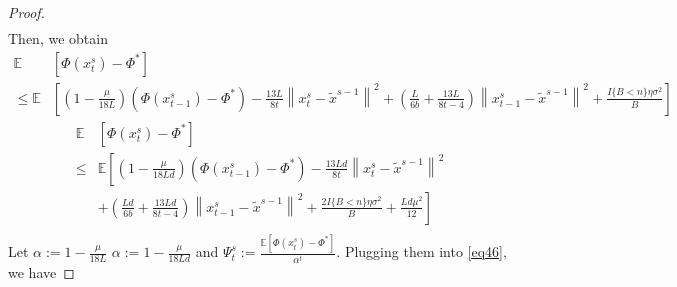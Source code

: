 \documentclass{article}
\newcommand*{\E}{\mathbb{E}}
\newcommand{\norm}[1]{\left\lVert#1\right\rVert}
\theoremstyle{definition}
\theoremstyle{remark}
\begin{document}
\begin{proof}
{\begin{equation}
\begin{split}
\end{split}
\end{equation}
}
Then, we obtain
\begin{equation}\label{eq46}
\begin{split}
\E&[\Phi({x}_{t}^s)-\Phi^*]\\
\leq\E&\left[\left(1- \frac{\mu}{18 L}\right)(\Phi({x}_{t-1}^s) - \Phi^*)  -\frac{13L}{8t}\norm{{x}_t^s-\tilde{x}^{s-1}}^2+(\frac{L}{6b}+\frac{13L}{8t-4}) \norm{x_{t-1}^s-\tilde{x}^{s-1}}^2 + \frac{I\{B < n\}\eta \sigma ^2}{B}\right]
\end{split}
\end{equation}
{\color{blue}
\begin{equation}\label{eq46}
\begin{split}
\E&[\Phi({x}_{t}^s)-\Phi^*] 
\\  
\leq& \E\left[\left(1- \frac{\mu}{18 Ld}\right)(\Phi({x}_{t-1}^s) - \Phi^*) -\frac{13L d}{8t}\norm{{x}_t^s-\tilde{x}^{s-1}}^2\right.\\
&\left.+(\frac{L d}{6b}+\frac{13Ld}{8t-4}) \norm{x_{t-1}^s-\tilde{x}^{s-1}}^2 + \frac{2I\{B < n\}\eta \sigma ^2}{B}+ \frac{L d \mu^2}{12}\right]\\
\end{split}
\end{equation}
}
Let $\alpha := 1 - \frac{\mu}{18 L}$ {\color{blue}$\alpha := 1 - \frac{\mu}{18 Ld}$} and $\Psi_t^s := \frac{\E[\Phi({x}_{t}^s)-\Phi^*]}{\alpha^t}$. Plugging them into \eqref{eq46}, we have  


\end{proof}
\end{document}
